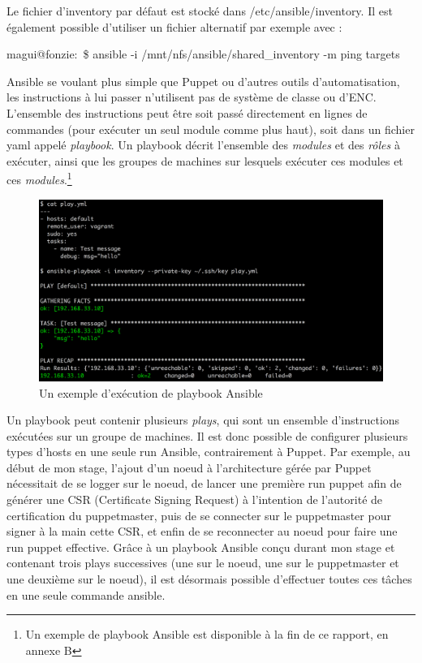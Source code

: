 \documentclass[14 pt]{extreport}
\begin{document}
Le fichier d'inventory par défaut est stocké dans /etc/ansible/inventory. Il est également possible d'utiliser un fichier alternatif par exemple avec :

\begin{framed}magui@fonzie:~\$ ansible -i /mnt/nfs/ansible/shared\_inventory -m ping targets\end{framed}

Ansible se voulant plus simple que Puppet ou d'autres outils d'automatisation, les instructions à lui passer n'utilisent pas de système de classe ou d'ENC. L'ensemble des instructions peut être soit passé directement en lignes de commandes (pour exécuter un seul module comme plus haut), soit dans un fichier yaml appelé \emph{playbook}. Un playbook décrit l'ensemble des \emph{modules} et des \emph{rôles} à exécuter, ainsi que les groupes de machines sur lesquels exécuter ces modules et ces \emph{modules}.\footnote{Un exemple de playbook Ansible est disponible à la fin de ce rapport, en annexe B}

\begin{figure}[htp]
\centering
\includegraphics[scale=1.10]{play.png}
\caption{Un exemple d'exécution de playbook Ansible}
\label{}
\end{figure}

Un playbook peut contenir plusieurs \emph{plays}, qui sont un ensemble d'instructions exécutées sur un groupe de machines. Il est donc possible de configurer plusieurs types d'hosts en une seule run Ansible, contrairement à Puppet. Par exemple, au début de mon stage, l'ajout d'un noeud à l'architecture gérée par Puppet nécessitait de se logger sur le noeud, de lancer une première run puppet afin de générer une CSR (Certificate Signing Request) à l'intention de l'autorité de certification du puppetmaster, puis de se connecter sur le puppetmaster pour signer à la main cette CSR, et enfin de se reconnecter au noeud pour faire une run puppet effective. Grâce à un playbook Ansible conçu durant mon stage et contenant trois plays successives (une sur le noeud, une sur le puppetmaster et une deuxième sur le noeud), il est désormais possible d'effectuer toutes ces tâches en une seule commande ansible.
\end{document}
